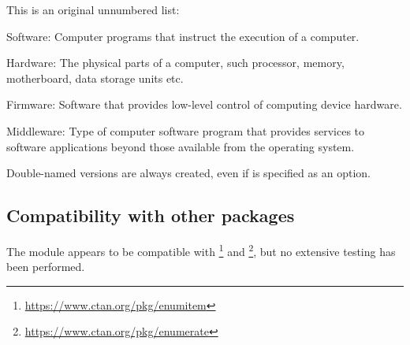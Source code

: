 \documentclass[a4paper, 11pt]{article}
\begin{document}
\bigskip
\begin{example}{}
    This is an original unnumbered list:

    \begin{itemizeitemize}
        \item Software: Computer programs that instruct the execution of a computer.
        \item Hardware: The physical parts of a computer, such processor, memory, motherboard, data storage units etc.
        \item Firmware: Software that provides low-level control of computing device hardware.
        \item Middleware: Type of computer software program that provides services to software applications beyond those available from the operating system.
    \end{itemizeitemize}
\end{example}

Double-named versions are always created, even if  is specified as an option.

\subsection{Compatibility with other packages}

The module  appears to be compatible with \footnote{\url{https://www.ctan.org/pkg/enumitem}} and \footnote{\url{https://www.ctan.org/pkg/enumerate}}, but no extensive testing has been performed.


%
%
%
%
\end{document}
